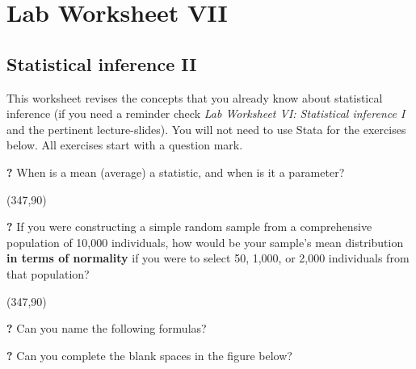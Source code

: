 \documentclass{article}
\newcommand{\forceindent}{\leavevmode{\parindent=2em\indent}}
\begin{document}
\pagestyle{fancy}
\fancyhf{}

\section*{\hfil Lab Worksheet VII \hfil}
\subsection*{Statistical inference II}

This worksheet revises the concepts that you already know about statistical inference (if you need a reminder check \textit{Lab Worksheet VI: Statistical inference I} and the pertinent lecture-slides). You will not need to use Stata for the exercises below. All exercises start with a question mark. 

\forceindent \textbf{?} When is a mean (average) a statistic, and when is it a parameter?

\framebox(347,90){}

\forceindent \textbf{?} If you were constructing a simple random sample from a comprehensive population of 10,000 individuals, how would be your sample's mean distribution \textbf{in terms of normality} if you were to select 50, 1,000, or 2,000 individuals from that population?

\framebox(347,90){}

\forceindent \textbf{?} Can you name the following formulas?

\begin{center}
\end{center}

\begin{center}
\end{center}

\begin{center}
\end{center}

\forceindent \textbf{?} Can you complete the blank spaces in the figure below?
\end{document}
